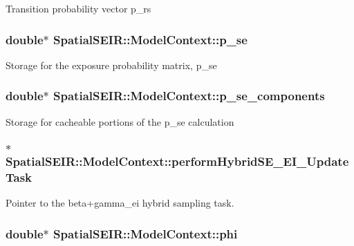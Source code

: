 Transition probability vector p\-\_\-rs \hypertarget{classSpatialSEIR_1_1ModelContext_a3039a6c9014a3465b38f5becbe369a4a}{
\subsubsection[{p\-\_\-se}]{\setlength{\rightskip}{0pt plus 5cm}double$\ast$ Spatial\-S\-E\-I\-R\-::\-Model\-Context\-::p\-\_\-se}}\label{classSpatialSEIR_1_1ModelContext_a3039a6c9014a3465b38f5becbe369a4a}
Storage for the exposure probability matrix, p\-\_\-se \hypertarget{classSpatialSEIR_1_1ModelContext_aa6a04d39cec1ace0e7c57c3551d12bc4}{
\subsubsection[{p\-\_\-se\-\_\-components}]{\setlength{\rightskip}{0pt plus 5cm}double$\ast$ Spatial\-S\-E\-I\-R\-::\-Model\-Context\-::p\-\_\-se\-\_\-components}}\label{classSpatialSEIR_1_1ModelContext_aa6a04d39cec1ace0e7c57c3551d12bc4}
Storage for cacheable portions of the p\-\_\-se calculation \hypertarget{classSpatialSEIR_1_1ModelContext_ae27950c823d73953740dd8e2267638af}{
\subsubsection[{perform\-Hybrid\-S\-E\-\_\-\-E\-I\-\_\-\-Update\-Task}]{$\ast$ Spatial\-S\-E\-I\-R\-::\-Model\-Context\-::perform\-Hybrid\-S\-E\-\_\-\-E\-I\-\_\-\-Update\-Task}}\label{classSpatialSEIR_1_1ModelContext_ae27950c823d73953740dd8e2267638af}
Pointer to the beta+gamma\-\_\-ei hybrid sampling task. \hypertarget{classSpatialSEIR_1_1ModelContext_a7873aaa6fe424c33d09287e63cdb6787}{
\subsubsection[{phi}]{\setlength{\rightskip}{0pt plus 5cm}double$\ast$ Spatial\-S\-E\-I\-R\-::\-Model\-Context\-::phi}}\label{classSpatialSEIR_1_1ModelContext_a7873aaa6fe424c33d09287e63cdb6787}

